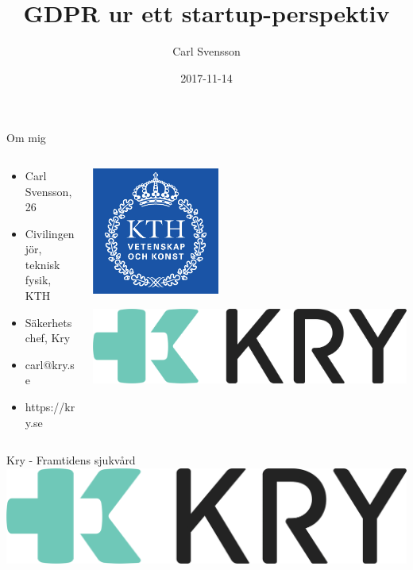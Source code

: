 \documentclass[10pt, compress]{beamer}
\title{GDPR ur ett startup-perspektiv}
\date{2017-11-14}
\author{Carl Svensson}
\institute{Cloud Confessions 2017}
\begin{document}
\maketitle

\begin{frame}{Om mig}
  
	\begin{columns}
		\begin{column}{0.6\textwidth}  
  
  		\begin{itemize}
		  \item Carl Svensson, 26
		  \item Civilingenjör, teknisk fysik, KTH
		  \item Säkerhetschef, Kry
		  \item \faEnvelope \hskip 2mm carl@kry.se
		  \item \faGlobe \hskip 2mm https://kry.se
		\end{itemize}
		
		\end{column}
		\begin{column}{0.4\textwidth} 
			\begin{center}
			\includegraphics[width=0.4\textwidth]{images/kth.jpg}
			\end{center}
			\vspace{1cm}
			\includegraphics[width=\textwidth]{images/kry_logo.png}
		\end{column}
	\end{columns}
  
\end{frame}

\begin{frame}{Kry - Framtidens sjukvård}
\includegraphics[width=\textwidth]{images/kry_logo.png}
\end{frame}
\end{document}
